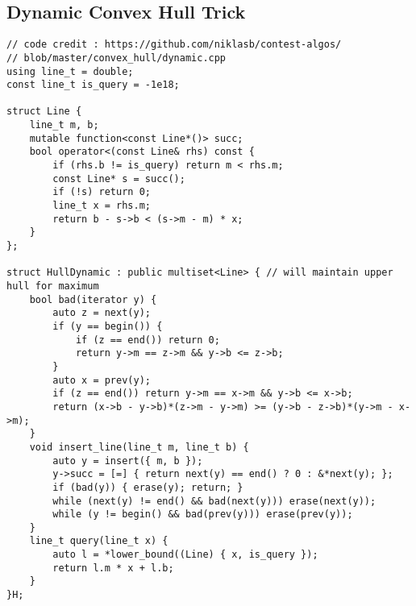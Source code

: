 \documentclass[landscape, 8pt, a4paper, oneside,  twocolumn]{extarticle}
\begin{document}
\subsection{Dynamic Convex Hull Trick}
\begin{verbatim}
// code credit : https://github.com/niklasb/contest-algos/
// blob/master/convex_hull/dynamic.cpp
using line_t = double;
const line_t is_query = -1e18;

struct Line {
	line_t m, b;
	mutable function<const Line*()> succ;
	bool operator<(const Line& rhs) const {
		if (rhs.b != is_query) return m < rhs.m;
		const Line* s = succ();
		if (!s) return 0;
		line_t x = rhs.m;
		return b - s->b < (s->m - m) * x;
	}
};

struct HullDynamic : public multiset<Line> { // will maintain upper hull for maximum
	bool bad(iterator y) {
		auto z = next(y);
		if (y == begin()) {
			if (z == end()) return 0;
			return y->m == z->m && y->b <= z->b;
		}
		auto x = prev(y);
		if (z == end()) return y->m == x->m && y->b <= x->b;
		return (x->b - y->b)*(z->m - y->m) >= (y->b - z->b)*(y->m - x->m);
	}
	void insert_line(line_t m, line_t b) {
		auto y = insert({ m, b });
		y->succ = [=] { return next(y) == end() ? 0 : &*next(y); };
		if (bad(y)) { erase(y); return; }
		while (next(y) != end() && bad(next(y))) erase(next(y));
		while (y != begin() && bad(prev(y))) erase(prev(y));
	}
	line_t query(line_t x) {
		auto l = *lower_bound((Line) { x, is_query });
		return l.m * x + l.b;
	}
}H;
\end{verbatim}
\end{document}
